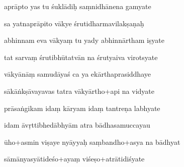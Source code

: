 \documentclass[article,12pt,a4paper]{memoir}%
\newcounter{parCount}
\begin{document}
	  
	  \pstart {} aprāpto yas tu śuklādiḥ saṃnidhānena gamyate 
	{}
	\pend%
      

	  
	  \pstart \leavevmode%
	sa yatnaprāpito vākye śrutidharmavilakṣaṇaḥ 
	{}
	\pend%
      

	  
	  \pstart {} abhinnam eva vākyaṃ tu yady abhinnārtham iṣyate 
	{}
	\pend%
      

	  
	  \pstart \leavevmode%
	tat sarvaṃ śrutibhūtatvān na śrutyaiva virotsyate 
	{}
	\pend%
      

	  
	  \pstart {} vākyānāṃ samudāyaś ca ya ekārthaprasiddhaye 
	{}
	\pend%
      

	  
	  \pstart \leavevmode%
	sākāṅkṣāvayavas tatra vākyārtho+api na vidyate 
	{}
	\pend%
      

	  
	  \pstart {} prāsaṅgikam idaṃ kāryam idaṃ tantreṇa labhyate 
	{}
	\pend%
      

	  
	  \pstart \leavevmode%
	idam āvṛttibhedābhyām atra bādhasamuccayau 
	{}
	\pend%
      

	  
	  \pstart {} ūho+asmin viṣaye nyāyyaḥ saṃbandho+asya na bādhyat 
	{}
	\pend%
      

	  
	  \pstart \leavevmode%
	sāmānyasyātideśo+ayaṃ viśeṣo+atrātidiśyate 
	{}
	\pend%
      
\end{document}
